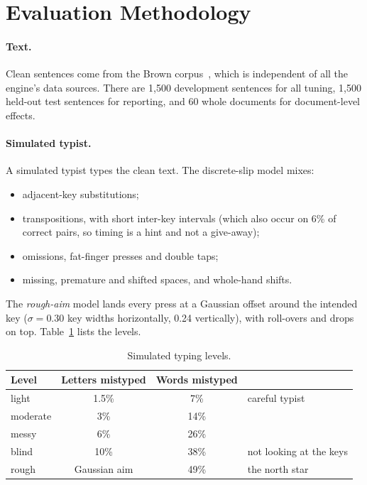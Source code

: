 \documentclass[11pt,a4paper]{article}
\begin{document}
\section{Evaluation Methodology}
\label{sec:eval}

\paragraph{Text.} Clean sentences come from the Brown corpus~\citep{francis1979}, which is independent of all the engine's data sources. There are 1,500 development sentences for all tuning, 1,500 held-out test sentences for reporting, and 60 whole documents for document-level effects.

\paragraph{Simulated typist.} A simulated typist types the clean text. The discrete-slip model mixes:
\begin{itemize}
\item adjacent-key substitutions;
\item transpositions, with short inter-key intervals (which also occur on 6\% of correct pairs, so timing is a hint and not a give-away);
\item omissions, fat-finger presses and double taps;
\item missing, premature and shifted spaces, and whole-hand shifts.
\end{itemize}
The \emph{rough-aim} model lands every press at a Gaussian offset around the intended key ($\sigma=0.30$ key widths horizontally, 0.24 vertically), with roll-overs and drops on top. Table~\ref{tab:levels} lists the levels.

\begin{table}[t]
\centering\small
\caption{Simulated typing levels.}
\label{tab:levels}
\begin{tabular}{lccl}
\toprule
Level & Letters mistyped & Words mistyped & \\
\midrule
light & 1.5\% & 7\% & careful typist \\
moderate & 3\% & 14\% & \\
messy & 6\% & 26\% & \\
blind & 10\% & 38\% & not looking at the keys \\
rough & Gaussian aim & 49\% & the north star \\
\bottomrule
\end{tabular}
\end{table}
\end{document}
